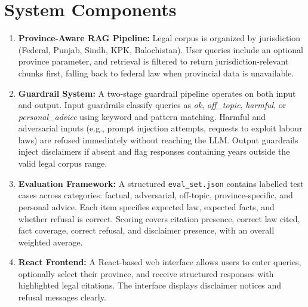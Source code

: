 \documentclass[10pt]{article}
\begin{document}
\section*{System Components}

\begin{enumerate}[leftmargin=*, itemsep=0pt, topsep=1pt]
\item \textbf{Province-Aware RAG Pipeline:} Legal corpus is organized by jurisdiction (Federal, Punjab, Sindh, KPK, Balochistan). User queries include an optional province parameter, and retrieval is filtered to return jurisdiction-relevant chunks first, falling back to federal law when provincial data is unavailable.

\item \textbf{Guardrail System:} A two-stage guardrail pipeline operates on both input and output. Input guardrails classify queries as \textit{ok}, \textit{off\_topic}, \textit{harmful}, or \textit{personal\_advice} using keyword and pattern matching. Harmful and adversarial inputs (e.g., prompt injection attempts, requests to exploit labour laws) are refused immediately without reaching the LLM. Output guardrails inject disclaimers if absent and flag responses containing years outside the valid legal corpus range.

\item \textbf{Evaluation Framework:} A structured \texttt{eval\_set.json} contains labelled test cases across categories: factual, adversarial, off-topic, province-specific, and personal advice. Each item specifies expected law, expected facts, and whether refusal is correct. Scoring covers citation presence, correct law cited, fact coverage, correct refusal, and disclaimer presence, with an overall weighted average.

\item \textbf{React Frontend:} A React-based web interface allows users to enter queries, optionally select their province, and receive structured responses with highlighted legal citations. The interface displays disclaimer notices and refusal messages clearly.
\end{enumerate}
\end{document}
